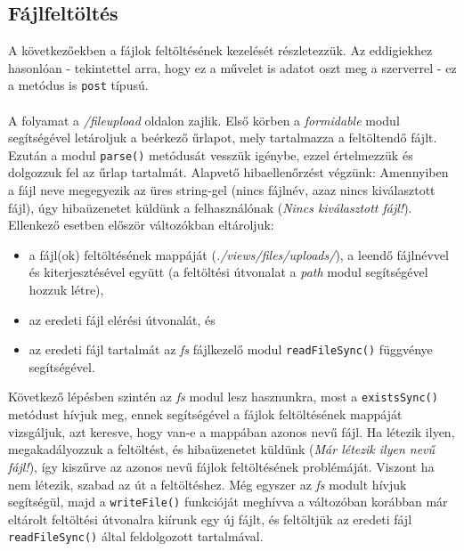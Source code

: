 \subsection{Fájlfeltöltés}

A következőekben a fájlok feltöltésének kezelését részletezzük. Az eddigiekhez hasonlóan - tekintettel arra, hogy ez a művelet is adatot oszt meg a szerverrel - ez a metódus is \texttt{post} típusú.\\

\\

A folyamat a \textit{/fileupload} oldalon zajlik. Első körben a \textit{formidable} modul segítségével letároljuk a beérkező űrlapot, mely tartalmazza a feltöltendő fájlt. Ezután a modul \texttt{parse()} metódusát vesszük igénybe, ezzel értelmezzük és dolgozzuk fel az űrlap tartalmát. Alapvető hibaellenőrzést végzünk: Amennyiben a fájl neve megegyezik az üres string-gel (nincs fájlnév, azaz nincs kiválasztott fájl), úgy hibaüzenetet küldünk a felhasználónak (\textit{Nincs kiválasztott fájl!}). Ellenkező esetben először változókban eltároljuk:
\begin{itemize}
\item{a fájl(ok) feltöltésének mappáját (\textit{./views/files/uploads/}), a leendő fájlnévvel és kiterjesztésével együtt (a feltöltési útvonalat a \textit{path} modul segítségével hozzuk létre),}
\item{az eredeti fájl elérési útvonalát, és}
\item{az eredeti fájl tartalmát az \textit{fs} fájlkezelő modul \texttt{readFileSync()} függvénye segítségével.}
\end{itemize}
Következő lépésben szintén az \textit{fs} modul lesz hasznunkra, most a \texttt{existsSync()} metódust hívjuk meg, ennek segítségével a fájlok feltöltésének mappáját vizsgáljuk, azt keresve, hogy van-e a mappában azonos nevű fájl. Ha létezik ilyen, megakadályozzuk a feltöltést, és hibaüzenetet küldünk (\textit{Már létezik ilyen nevű fájl!}), így kiszűrve az azonos nevű fájlok feltöltésének problémáját. Viszont ha nem létezik, szabad az út a feltöltéshez. Még egyszer az \textit{fs} modult hívjuk segítségül, majd a \texttt{writeFile()} funkcióját meghívva a változóban korábban már eltárolt feltöltési útvonalra kiírunk egy új fájlt, és feltöltjük az eredeti fájl \texttt{readFileSync()} által feldolgozott tartalmával.\\

\\

